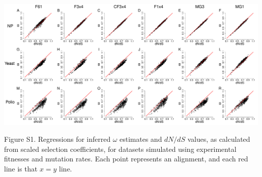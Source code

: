 \documentclass[11pt]{article}
\begin{document}
\newpage

\begin{landscape}
	\includegraphics[width=9.5in]{figures/SI/nyp_regression.pdf}
	\vspace{0.5cm}
	
	Figure S1. Regressions for inferred $\omega$ estimates and $dN/dS$ values, as calculated from scaled selection coefficients, for datasets simulated using experimental fitnesses and mutation rates. Each point represents an alignment, and each red line is that $x=y$ line.
\end{landscape}
\end{document}
